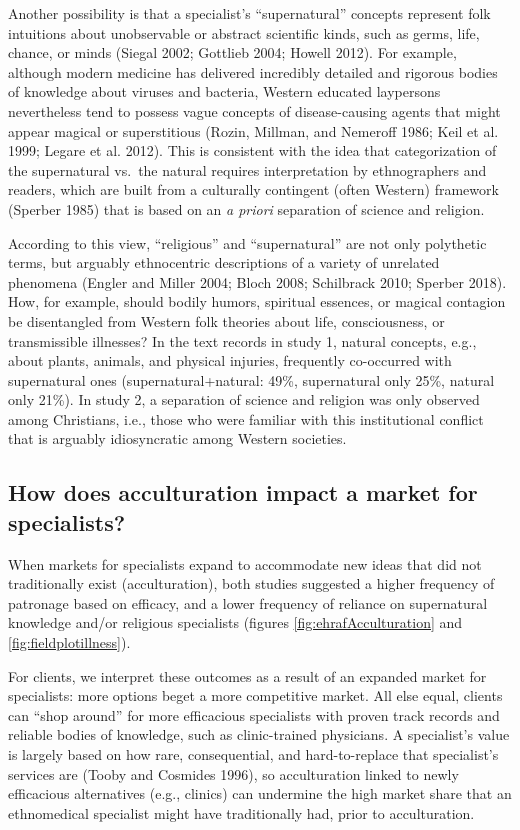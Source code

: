 \documentclass[
  11pt,
]{article}
\begin{document}
Another possibility is that a specialist's ``supernatural'' concepts represent folk intuitions about unobservable or abstract scientific kinds, such as germs, life, chance, or minds (Siegal 2002; Gottlieb 2004; Howell 2012). For example, although modern medicine has delivered incredibly detailed and rigorous bodies of knowledge about viruses and bacteria, Western educated laypersons nevertheless tend to possess vague concepts of disease-causing agents that might appear magical or superstitious (Rozin, Millman, and Nemeroff 1986; Keil et al. 1999; Legare et al. 2012). This is consistent with the idea that categorization of the supernatural vs.~the natural requires interpretation by ethnographers and readers, which are built from a culturally contingent (often Western) framework (Sperber 1985) that is based on an \emph{a priori} separation of science and religion.

According to this view, ``religious'' and ``supernatural'' are not only polythetic terms, but arguably ethnocentric descriptions of a variety of unrelated phenomena (Engler and Miller 2004; Bloch 2008; Schilbrack 2010; Sperber 2018). How, for example, should bodily humors, spiritual essences, or magical contagion be disentangled from Western folk theories about life, consciousness, or transmissible illnesses? In the text records in study 1, natural concepts, e.g., about plants, animals, and physical injuries, frequently co-occurred with supernatural ones (supernatural+natural: 49\%, supernatural only 25\%, natural only 21\%). In study 2, a separation of science and religion was only observed among Christians, i.e., those who were familiar with this institutional conflict that is arguably idiosyncratic among Western societies.

\hypertarget{how-does-acculturation-impact-a-market-for-specialists}{%
\subsection{How does acculturation impact a market for specialists?}\label{how-does-acculturation-impact-a-market-for-specialists}}

When markets for specialists expand to accommodate new ideas that did not traditionally exist (acculturation), both studies suggested a higher frequency of patronage based on efficacy, and a lower frequency of reliance on supernatural knowledge and/or religious specialists (figures \ref{fig:ehrafAcculturation} and \ref{fig:fieldplotillness}).

For clients, we interpret these outcomes as a result of an expanded market for specialists: more options beget a more competitive market. All else equal, clients can ``shop around'' for more efficacious specialists with proven track records and reliable bodies of knowledge, such as clinic-trained physicians. A specialist's value is largely based on how rare, consequential, and hard-to-replace that specialist's services are (Tooby and Cosmides 1996), so acculturation linked to newly efficacious alternatives (e.g., clinics) can undermine the high market share that an ethnomedical specialist might have traditionally had, prior to acculturation.
\end{document}
